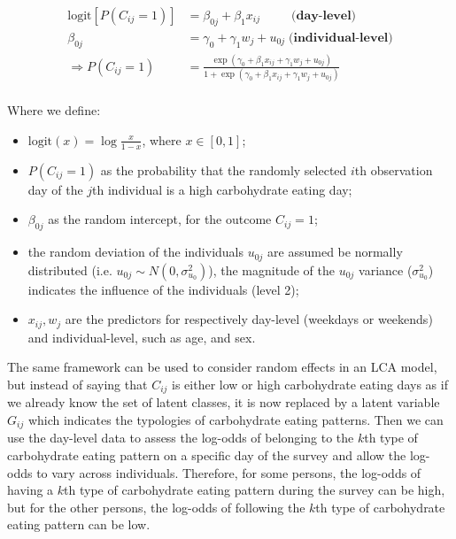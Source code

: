 \begin{equation}
\begin{aligned}
\text{logit}[P(C_{ij} = 1)] & = \beta_{0j} + \beta_{1}x_{ij} \;\;\;\;\;\;\;\;\; \textbf{(day-level)}  \\
\beta_{0j} & = \gamma_0 + \gamma_1 w_j + u_{0j} \; \textbf{(individual-level)} \\ 
\Rightarrow P(C_{ij} = 1) & = \frac{\exp{(\gamma_0 + \beta_{1}x_{ij} + \gamma_1 w_j + u_{0j})}}{1 + \exp{(\gamma_0 + \beta_{1}x_{ij} + \gamma_1 w_j + u_{0j})}} \\
\end{aligned}
\label{randomLCA}
\end{equation}
\vspace{-0.3cm}

Where we define: 

\begin{itemize}
	\item $\text{logit}{(x)} = \log{\frac{x}{1-x}}$, where $x \in [0,1]$;
	\item $P(C_{ij} = 1)$ as the probability that the randomly selected $i$th observation day of the $j$th individual is a high carbohydrate eating day;
	\item $\beta_{0j}$ as the random intercept, for the outcome $C_{ij} = 1$; 
	\item the random deviation of the individuals $u_{0j}$ are assumed be normally distributed (i.e. $u_{0j} \sim N(0, \sigma_{u_0}^2)$), the magnitude of the $u_{0j}$ variance ($\sigma_{u_0}^2$) indicates the influence of the individuals (level 2);
	\item $x_{ij}, w_j$ are the predictors for respectively day-level (weekdays or weekends) and individual-level, such as age, and sex.
\end{itemize}



The same framework can be used to consider random effects in an LCA model, but instead of saying that $C_{ij}$ is either low or high carbohydrate eating days as if we already know the set of latent classes, it is now replaced by a latent variable $G_{ij}$ which indicates the typologies of carbohydrate eating patterns. Then we can use the day-level data to assess the log-odds of belonging to the $k$th type of carbohydrate eating pattern on a specific day of the survey and allow the log-odds to vary across individuals. Therefore, for some persons, the log-odds of having a $k$th type of carbohydrate eating pattern during the survey can be high, but for the other persons, the log-odds of following the $k$th type of carbohydrate eating pattern can be low. 

